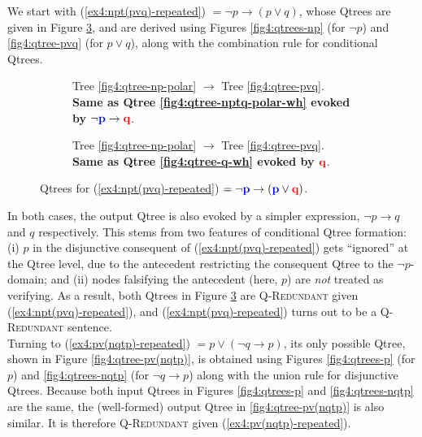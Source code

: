 We start with (\ref{ex4:npt(pvq)-repeated}) $ = \neg p \rightarrow (p\vee q)$, whose Qtrees are given in Figure \ref{fig4:qtrees-npt(pvq)}, and are derived using Figures \ref{fig4:qtrees-np} (for $\neg p$) and \ref{fig4:qtree-pvq} (for $p\vee q$), along with the combination rule for conditional Qtrees.

\begin{figure}[H]\setlength{\fboxsep}{2pt}
	\centering
	\begin{subfigure}[b]{.4\linewidth}
		\centering
		\caption[]{Tree \ref{fig4:qtree-np-polar} $\rightarrow$ Tree \ref{fig4:qtree-pvq}.\\\textbf{Same as Qtree \ref{fig4:qtree-nptq-polar-wh} evoked by $\neg \textbf{\textcolor{blue}{p}} \rightarrow \textbf{\textcolor{red}{q}}$}.}\label{fig4:qtree-npt(pvq)-1}
	\end{subfigure}\hfill
	\begin{subfigure}[b]{.4\linewidth}
		\centering
		\scalebox{1}{
			\begin{forest}
				[CS [$\p$] [\fbox{$\q$}] [\dbox{$\r$}] [\dbox{...}] ]
		\end{forest}}
		\caption[]{Tree \ref{fig4:qtree-np-polar} $\rightarrow$ Tree \ref{fig4:qtree-pvq}.\footnotemark \\\textbf{Same as Qtree \ref{fig4:qtree-q-wh} evoked by $\q$}.}\label{fig4:qtree-npt(pvq)-2}
	\end{subfigure}
	\caption[]{Qtrees for (\ref{ex4:npt(pvq)-repeated}) $= \neg \textbf{\textcolor{blue}{p}} \rightarrow (\textbf{\textcolor{blue}{p}}\vee \textbf{\textcolor{red}{q}})$.}\label{fig4:qtrees-npt(pvq)}
\end{figure}

In both cases, the output Qtree is also evoked by a simpler expression, $\neg p \rightarrow q$ and $q$ respectively. This stems from two features of conditional Qtree formation: (i) $p$ in the disjunctive consequent of (\ref{ex4:npt(pvq)-repeated}) gets ``ignored'' at the Qtree level, due to the antecedent restricting the consequent Qtree to the $\neg p$-domain; and (ii) nodes falsifying the antecedent (here, $p$) are \textit{not} treated as verifying. As a result, both Qtrees in Figure \ref{fig4:qtrees-npt(pvq)} are \textsc{Q-Redundant} given (\ref{ex4:npt(pvq)-repeated}), and (\ref{ex4:npt(pvq)-repeated}) turns out to be a \textsc{Q-Redundant} sentence.\\



Turning to (\ref{ex4:pv(nqtp)-repeated}) $ = p \vee (\neg q \rightarrow p)$, its only possible Qtree, shown in Figure \ref{fig4:qtree-pv(nqtp)}, is obtained using Figures \ref{fig4:qtrees-p} (for $p$) and \ref{fig4:qtrees-nqtp} (for $\neg q \rightarrow p$) along with the union rule for disjunctive Qtrees. Because both input Qtrees in Figures \ref{fig4:qtrees-p} and \ref{fig4:qtrees-nqtp} are the same, the (well-formed) output Qtree in \ref{fig4:qtree-pv(nqtp)} is also similar. It is therefore \textsc{Q-Redundant} given (\ref{ex4:pv(nqtp)-repeated}).

